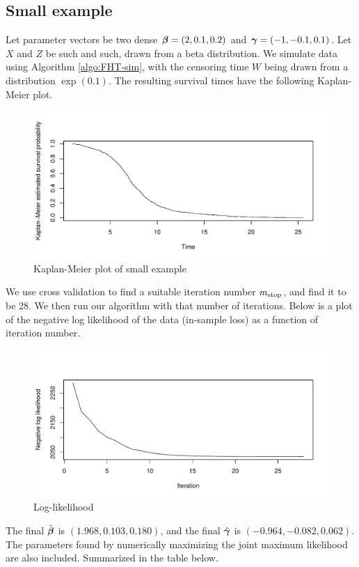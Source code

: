 \subsection{Small example}
Let parameter vectors be two dense $\boldsymbol{\beta}=(2,0.1,0.2)$ and $\boldsymbol{\gamma}=(-1, -0.1, 0.1)$. Let $X$ and $Z$ be such and such, drawn from a beta distribution.
We simulate data using Algorithm \ref{algo:FHT-sim}, with the censoring time $W$ being drawn from a distribution $\exp(0.1)$. The resulting survival times have the following Kaplan-Meier plot.
\begin{figure}
\caption{Kaplan-Meier plot of small example}
\centering\includegraphics[scale=0.4]{figures/case1.pdf}
\end{figure}
We use cross validation to find a suitable iteration number $m_{\text{stop}}$, and find it to be 28. We then run our algorithm with that number of iterations. Below is a plot of the negative log likelihood of the data (in-sample loss) as a function of iteration number.
\begin{figure}
\caption{Log-likelihood}
\centering\includegraphics[scale=0.4]{figures/case1_loglik.pdf}
\end{figure}
The final $\hat{\boldsymbol{\beta}}$ is $(1.968, 0.103, 0.180)$, and the final $\hat{\boldsymbol{\gamma}}$ is $(-0.964, -0.082, 0.062)$. The parameters found by numerically maximizing the joint maximum likelihood are also included. Summarized in the table below.

